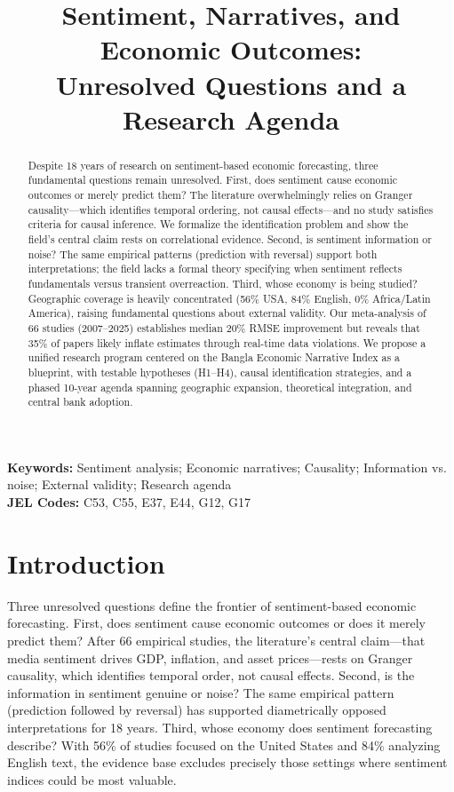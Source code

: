 \documentclass[11pt]{article}
\title{\textbf{Sentiment, Narratives, and Economic Outcomes:\\
Unresolved Questions and a Research Agenda}}
\author{} %
\date{}
\begin{document}
\maketitle

\begin{abstract}
Despite 18 years of research on sentiment-based economic forecasting, three fundamental questions remain unresolved. First, does sentiment cause economic outcomes or merely predict them? The literature overwhelmingly relies on Granger causality---which identifies temporal ordering, not causal effects---and no study satisfies criteria for causal inference. We formalize the identification problem and show the field's central claim rests on correlational evidence. Second, is sentiment information or noise? The same empirical patterns (prediction with reversal) support both interpretations; the field lacks a formal theory specifying when sentiment reflects fundamentals versus transient overreaction. Third, whose economy is being studied? Geographic coverage is heavily concentrated (56\% USA, 84\% English, 0\% Africa/Latin America), raising fundamental questions about external validity. Our meta-analysis of 66 studies (2007--2025) establishes median 20\% RMSE improvement but reveals that 35\% of papers likely inflate estimates through real-time data violations. We propose a unified research program centered on the Bangla Economic Narrative Index as a blueprint, with testable hypotheses (H1--H4), causal identification strategies, and a phased 10-year agenda spanning geographic expansion, theoretical integration, and central bank adoption.
\end{abstract}

\noindent \textbf{Keywords:} Sentiment analysis; Economic narratives; Causality; Information vs. noise; External validity; Research agenda \\
\textbf{JEL Codes:} C53, C55, E37, E44, G12, G17

\section{Introduction}

Three unresolved questions define the frontier of sentiment-based economic forecasting. First, does sentiment cause economic outcomes or does it merely predict them? After 66 empirical studies, the literature's central claim---that media sentiment drives GDP, inflation, and asset prices---rests on Granger causality, which identifies temporal order, not causal effects. Second, is the information in sentiment genuine or noise? The same empirical pattern (prediction followed by reversal) has supported diametrically opposed interpretations for 18 years. Third, whose economy does sentiment forecasting describe? With 56\% of studies focused on the United States and 84\% analyzing English text, the evidence base excludes precisely those settings where sentiment indices could be most valuable.
\end{document}
